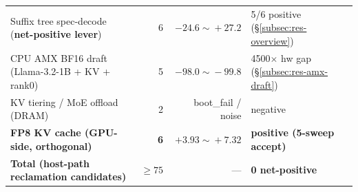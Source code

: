 \begin{table}[t]
{\begin{tabular}{@{}lrrl@{}}
Suffix tree spec-decode (\textbf{net-positive lever})    &  6 & $-24.6\!\sim\!+27.2$ & 5/6 positive (\S\ref{subsec:res-overview}) \\
CPU AMX BF16 draft (Llama-3.2-1B + KV + rank0)           &  5 & $-98.0\!\sim\!-99.8$ & 4500$\times$ hw gap (\S\ref{subsec:res-amx-draft}) \\
KV tiering / MoE offload (DRAM)                           &  2 & boot\_fail / noise   & negative \\
\textbf{FP8 KV cache (GPU-side, orthogonal)}              &  \textbf{6} & $\mathbf{+3.93\!\sim\!+7.32}$ & \textbf{positive (5-sweep accept)} \\
\midrule
\textbf{Total (host-path reclamation candidates)}        & \textbf{$\ge75$} & --- & \textbf{0 net-positive} \\
\bottomrule
\end{tabular}}
\end{table}
